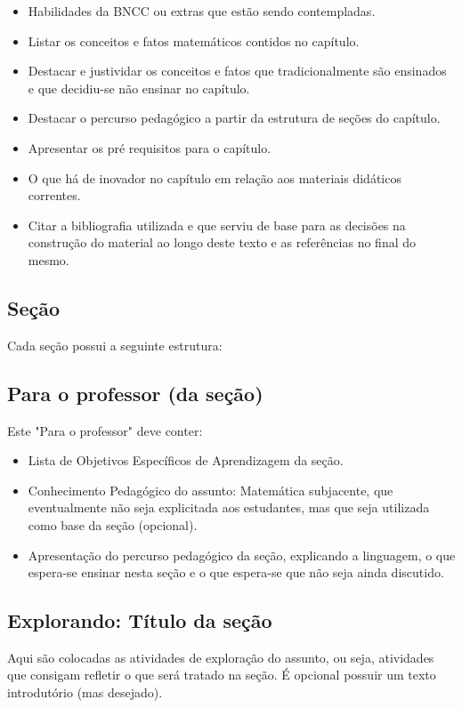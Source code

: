 \begin{itemize}
\item Habilidades da BNCC ou extras que estão sendo contempladas.
\item Listar os conceitos e fatos matemáticos contidos no capítulo.
\item Destacar e justividar os conceitos e fatos que tradicionalmente são ensinados e que decidiu-se não ensinar no capítulo.
\item Destacar o percurso pedagógico a partir da estrutura de seções do capítulo.
\item Apresentar os pré requisitos para o capítulo.
\item O que há de inovador no capítulo em relação aos materiais didáticos correntes.
\item Citar a bibliografia utilizada e que serviu de base para as decisões na construção do material ao longo deste texto e as referências no final do mesmo.
\end{itemize}

\subsection{Seção}

Cada seção possui a seguinte estrutura:

\subsection{Para o professor (da seção)}
Este "Para o professor"{} deve conter:
\begin{itemize}
\item Lista de Objetivos Específicos de Aprendizagem da seção.
\item Conhecimento Pedagógico do assunto: Matemática subjacente, que eventualmente não seja explicitada aos estudantes, mas que seja utilizada como base da seção (opcional).
\item Apresentação do percurso pedagógico da seção, explicando a linguagem, o que espera-se ensinar nesta seção e o que espera-se que não seja ainda discutido.
\end{itemize}

\def\currentcolor{session1}
\subsection{Explorando: Título da seção}

Aqui são colocadas as atividades de exploração do assunto, ou seja, atividades que consigam refletir o que será tratado na seção. É opcional possuir um texto introdutório (mas desejado).

